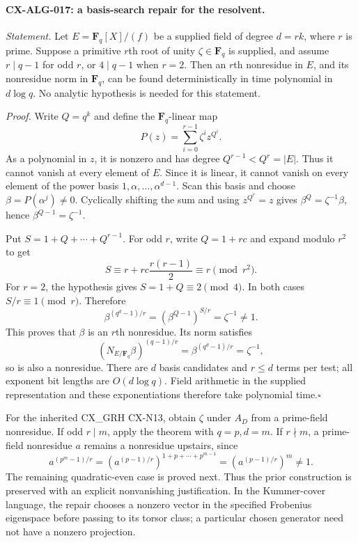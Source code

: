 \paragraph{CX-ALG-017: a basis-search repair for the resolvent.}
\emph{Statement.} Let $E=\mathbf F_q[X]/(f)$ be a supplied field of degree
$d=rk$, where $r$ is prime. Suppose a primitive $r$th root of unity
$\zeta\in\mathbf F_q$ is supplied, and assume $r\mid q-1$ for odd $r$,
or $4\mid q-1$ when $r=2$. Then an $r$th nonresidue in $E$, and its
nonresidue norm in $\mathbf F_q$, can be found deterministically in time
polynomial in $d\log q$. No analytic hypothesis is needed for this statement.

\emph{Proof.} Write $Q=q^k$ and define the $\mathbf F_q$-linear map
\[
       P(z)=\sum_{i=0}^{r-1}\zeta^i z^{Q^i}.
\]
As a polynomial in $z$, it is nonzero and has degree
$Q^{r-1}<Q^r=|E|$. Thus it cannot vanish at every element of $E$.
Since it is linear, it cannot vanish on every element of the power basis
$1,\alpha,\ldots,\alpha^{d-1}$. Scan this basis and choose
$\beta=P(\alpha^j)\ne0$. Cyclically shifting the sum and using
$z^{Q^r}=z$ gives $\beta^Q=\zeta^{-1}\beta$, hence
$\beta^{Q-1}=\zeta^{-1}$.

Put $S=1+Q+\cdots+Q^{r-1}$. For odd $r$, write $Q=1+rc$ and expand
modulo $r^2$ to get
\[
 S\equiv r+rc\frac{r(r-1)}2\equiv r\pmod{r^2}.
\]
For $r=2$, the hypothesis gives $S=1+Q\equiv2\pmod4$.
In both cases $S/r\equiv1\pmod r$. Therefore
\[
 \beta^{(q^d-1)/r}
   =\left(\beta^{Q-1}\right)^{S/r}=\zeta^{-1}\ne1.
\]
This proves that $\beta$ is an $r$th nonresidue. Its norm satisfies
\[
 \left(N_{E/\mathbf F_q}\beta\right)^{(q-1)/r}
      =\beta^{(q^d-1)/r}=\zeta^{-1},
\]
so is also a nonresidue. There are $d$ basis candidates and $r\le d$
terms per test; all exponent bit lengths are $O(d\log q)$.
Field arithmetic in the supplied representation and these exponentiations
therefore take polynomial time.\hfill$\square$

For the inherited CX\_GRH CX-N13, obtain $\zeta$ under $A_D$ from a
prime-field nonresidue. If odd $r\mid m$, apply the theorem with
$q=p,d=m$. If $r\nmid m$, a prime-field nonresidue $a$ remains a
nonresidue upstairs, since
\[
 a^{(p^m-1)/r}
   =\left(a^{(p-1)/r}\right)^{1+p+\cdots+p^{m-1}}
   =\left(a^{(p-1)/r}\right)^m\ne1.
\]
The remaining quadratic-even case is proved next. Thus the prior
construction is preserved with an explicit nonvanishing justification.
In the Kummer-cover language, the repair chooses a nonzero vector in the
specified Frobenius eigenspace before passing to its torsor class; a
particular chosen generator need not have a nonzero projection.

